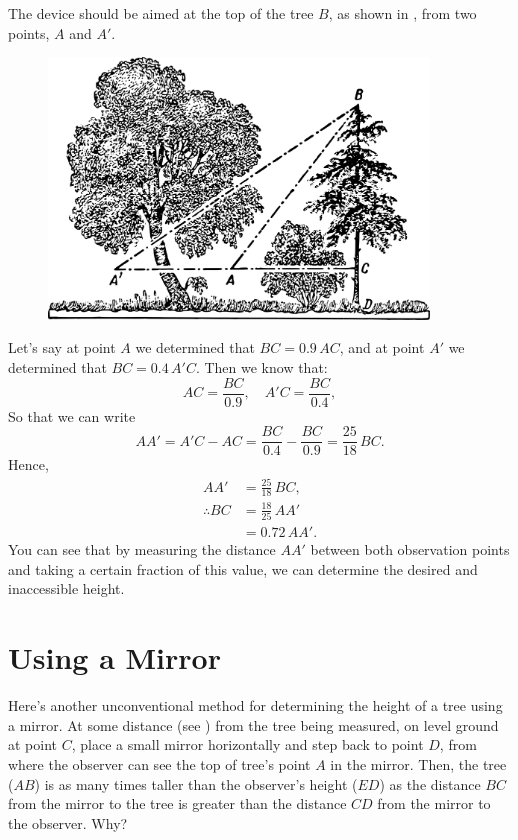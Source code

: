 \ans The device should be aimed at the top of the tree $B$, as shown in , from two points, $A$ and $A'$. 

\begin{figure}[h!]
\centering
\includegraphics[width=0.9\textwidth]{figures/ch-01/fig-01-13.pdf}
\end{figure}

Let's say at point $A$ we determined that $BC = 0.9\,AC$, and at point $A'$ we determined that $BC = 0.4\,A'C$. Then we know that:
\begin{equation*}%
AC = \frac{BC}{0.9},\quad   A'C  = \frac{BC}{0.4},
\end{equation*}
So that we can write
\begin{equation*}%
AA' = A'C - AC = \frac{BC}{0.4} - \frac{BC}{0.9} = \frac{25}{18} \,BC.
\end{equation*}
Hence,
\begin{align*}%
AA' & = \frac{25}{18} \,BC, \\ 
\therefore BC & = \frac{18}{25} \,AA' \\
& = 0.72 \, AA'.
\end{align*}
You can see that by measuring the distance $AA'$ between both observation points and taking a certain fraction of this value, we can determine the desired and inaccessible height.

\section{Using a Mirror}
\label{sec-1.8}


\ques Here's another unconventional method for determining the height of a tree using a mirror. At some distance (see ) from the tree being measured, on level ground at point $C$, place a small mirror horizontally and step back to point $D$, from where the observer can see the top of tree's point $A$ in the mirror. Then, the tree ($AB$) is as many times taller than the observer's height ($ED$) as the distance $BC$ from the mirror to the tree is greater than the distance $CD$ from the mirror to the observer. Why?

